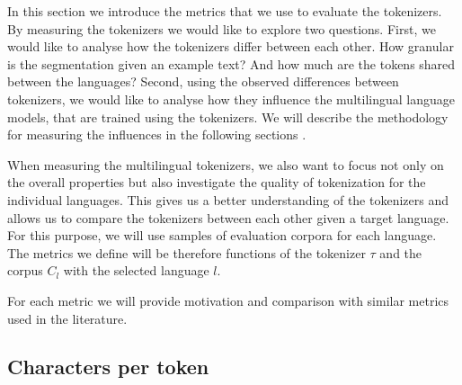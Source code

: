 

In this section we introduce the metrics that we use to evaluate the tokenizers. By measuring the tokenizers we would like to explore two questions. First, we would like to analyse how the tokenizers differ between each other. How granular is the segmentation given an example text? And how much are the tokens shared between the languages? Second, using the observed differences between tokenizers, we would like to analyse how they influence the multilingual language models, that are trained using the tokenizers. We will describe the methodology for measuring the influences in the following sections .

When measuring the multilingual tokenizers, we also want to focus not only on the overall properties but also investigate the quality of tokenization for the individual languages. This gives us a better understanding of the tokenizers and allows us to compare the tokenizers between each other given a target language. For this purpose, we will use samples of evaluation corpora for each language. The metrics we define will be therefore functions of the tokenizer $\tau$ and the corpus $C_l$ with the selected language $l$. 

For each metric we will provide motivation and comparison with similar metrics used in the literature. 


\subsection{Characters per token}

